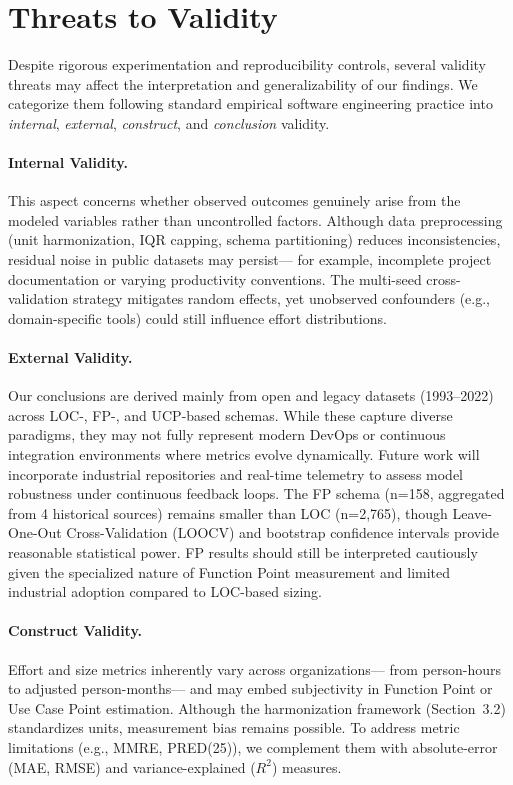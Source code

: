 \documentclass[11pt,a4paper]{article}
\begin{document}
\section{Threats to Validity}


Despite rigorous experimentation and reproducibility controls, 
several validity threats may affect the interpretation and generalizability of our findings.
We categorize them following standard empirical software engineering practice 
into \textit{internal}, \textit{external}, \textit{construct}, and \textit{conclusion} validity.

\paragraph{Internal Validity.}
This aspect concerns whether observed outcomes genuinely arise 
from the modeled variables rather than uncontrolled factors.
Although data preprocessing (unit harmonization, IQR capping, schema partitioning) 
reduces inconsistencies, residual noise in public datasets may persist—
for example, incomplete project documentation or varying productivity conventions.
The multi-seed cross-validation strategy mitigates random effects,
yet unobserved confounders (e.g., domain-specific tools) 
could still influence effort distributions.

\paragraph{External Validity.}
Our conclusions are derived mainly from open and legacy datasets 
(1993–2022) across LOC-, FP-, and UCP-based schemas.
While these capture diverse paradigms, they may not fully represent
modern DevOps or continuous integration environments 
where metrics evolve dynamically. 
Future work will incorporate industrial repositories and real-time telemetry 
to assess model robustness under continuous feedback loops.
The FP schema (n=158, aggregated from 4 historical sources) remains smaller than LOC (n=2,765), though Leave-One-Out Cross-Validation (LOOCV) and bootstrap confidence intervals provide reasonable statistical power. FP results should still be interpreted cautiously given the specialized nature of Function Point measurement and limited industrial adoption compared to LOC-based sizing.

\paragraph{Construct Validity.}
Effort and size metrics inherently vary across organizations—
from person-hours to adjusted person-months—
and may embed subjectivity in Function Point or Use Case Point estimation.  
Although the harmonization framework (Section~3.2) standardizes units, 
measurement bias remains possible.
To address metric limitations (e.g., MMRE, PRED(25)),
we complement them with absolute-error (MAE, RMSE) 
and variance-explained ($R^2$) measures.
\end{document}
